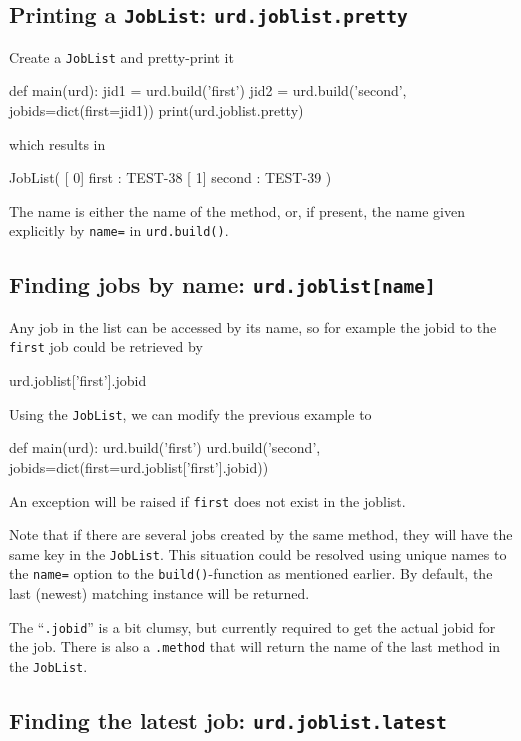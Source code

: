 \subsection{Printing a \texttt{JobList}:  \texttt{urd.joblist.pretty}}

Create a \texttt{JobList} and pretty-print it
\begin{python}
def main(urd):
    jid1 = urd.build('first')
    jid2 = urd.build('second', jobids=dict(first=jid1))
    print(urd.joblist.pretty)
\end{python}
which results in
\begin{shell}
JobList(
   [  0]  first : TEST-38
   [  1] second : TEST-39
)
\end{shell}
The name is either the name of the method, or, if present, the name
given explicitly by \texttt{name=} in \texttt{urd.build()}.




\subsection{Finding jobs by name:  \texttt{urd.joblist[name]}}
\label{sec:clumsy_dot_jobid}

Any job in the list can be accessed by its name, so for example the
jobid to the \texttt{first} job could be retrieved by
\begin{python}
urd.joblist['first'].jobid
\end{python}
Using the \texttt{JobList}, we can modify the previous example to
\begin{python}
def main(urd):
    urd.build('first')
    urd.build('second', jobids=dict(first=urd.joblist['first'].jobid))
\end{python}
An exception will be raised if \texttt{first} does not exist in the
joblist.

Note that if there are several jobs created by the same method, they
will have the same key in the \texttt{JobList}.  This situation could be
resolved using unique names to the \texttt{name=} option to
the \texttt{build()}-function as mentioned earlier.  By default, the
last (newest) matching instance will be returned.

The ``\texttt{.jobid}'' is a bit clumsy, but currently required to get
the actual jobid for the job.  There is also a \texttt{.method} that
will return the name of the last method in the \texttt{JobList}.



\subsection{Finding the latest job:  \texttt{urd.joblist.latest}}

